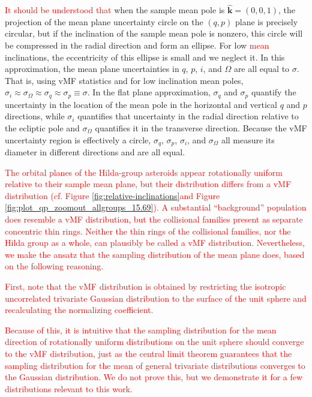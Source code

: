 \documentclass[a4paper,fleqn]{cas-sc}
\begin{document}
\begin{linenumbers}
\textcolor{red}{It should be understood that}
when the sample mean pole is $\hat{\mathbf{k}}=(0,0,1)$, the projection of the mean plane uncertainty circle on the $(q,p)$ plane is precisely circular, but if the inclination of the sample mean pole is nonzero, this circle will be compressed in the radial direction and form an ellipse.
For low \textcolor{red}{mean} inclinations, the eccentricity of this ellipse is small and we neglect it.
In this approximation, the mean plane uncertainties in $q$, $p$, $i$, and $\Omega$ are all equal to $\sigma$.
That is, using vMF statistics and for low inclination mean poles, $\sigma_i\approx\sigma_\Omega\approx\sigma_q\approx\sigma_p\equiv\sigma$.
In the flat plane approximation, $\sigma_q$ and $\sigma_p$ quantify the uncertainty in the location of the mean pole in the horizontal and vertical $q$ and $p$ directions, while $\sigma_i$ quantifies that uncertainty in the radial direction relative to the ecliptic pole and $\sigma_\Omega$ quantifies it in the transverse direction.
Because the vMF uncertainty region is effectively a circle, $\sigma_q$, $\sigma_p$, $\sigma_i$, and $\sigma_\Omega$ all measure its diameter in different directions and are all equal.



\textcolor{red}{
The orbital planes of the Hilda-group asteroids appear rotationally uniform relative to their sample mean plane, but their distribution differs from a vMF distribution (cf. Figure \ref{fig:relative-inclinations}and Figure \ref{fig:plot_qp_zoomout_allgroups_15.69}).
A substantial ``background'' population does resemble a vMF distribution, but the collisional families present as separate concentric thin rings.
Neither the thin rings of the collisional families, nor the Hilda group as a whole, can plausibly be called a vMF distribution.
Nevertheless, we make the ansatz that the sampling distribution of the mean plane does, based on the following reasoning.
}

\textcolor{red}{
First, note that the vMF distribution is obtained by restricting the isotropic uncorrelated trivariate Gaussian distribution to the surface of the unit sphere and recalculating the normalizing coefficient.
}

\textcolor{red}{
Because of this, it is intuitive that the sampling distribution for the mean direction of rotationally uniform distributions on the unit sphere should converge to the vMF distribution, just as the central limit theorem guarantees that the sampling distribution for the mean of general trivariate distributions converges to the Gaussian distribution.
We do not prove this, but we demonstrate it for a few distributions relevant to this work.}


\end{linenumbers}
\end{document}
